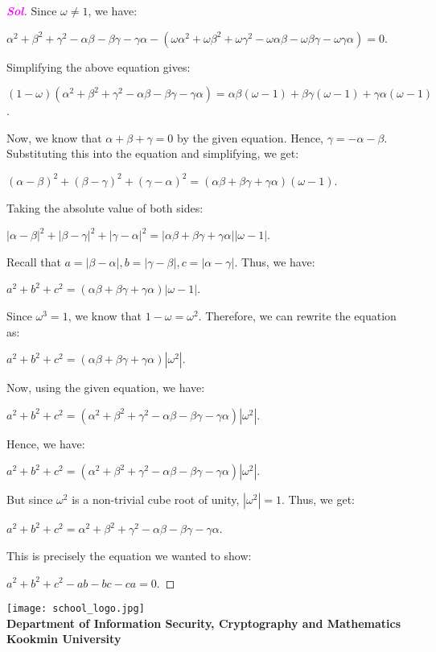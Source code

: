 \documentclass{article}
\newcommand{\footer}[1]{
\begin{flushright}
	\vspace{2em}
	\texttt{[image: school\_logo.jpg]} \\
	\vspace{1em}
	\textcolor{blue2}{\small\textbf{#1}}
\end{flushright}
}
\theoremstyle{definition}
\newcommand{\sol}{\textcolor{magenta}{\bf Sol}}
\begin{document}
\begin{enumerate}
\begin{proof}[\sol]
	Since $\omega \neq 1$, we have:
	
	$\alpha^2 + \beta^2 + \gamma^2 - \alpha\beta - \beta\gamma - \gamma\alpha - (\omega\alpha^2 + \omega\beta^2 + \omega\gamma^2 - \omega\alpha\beta - \omega\beta\gamma - \omega\gamma\alpha) = 0$.
	
	Simplifying the above equation gives:
	
	$(1-\omega)(\alpha^2 + \beta^2 + \gamma^2 - \alpha\beta - \beta\gamma - \gamma\alpha) = \alpha\beta(\omega - 1) + \beta\gamma(\omega - 1) + \gamma\alpha(\omega - 1)$.
	
	Now, we know that $\alpha + \beta + \gamma = 0$ by the given equation. Hence, $\gamma = -\alpha - \beta$. Substituting this into the equation and simplifying, we get:
	
	$(\alpha - \beta)^2 + (\beta - \gamma)^2 + (\gamma - \alpha)^2 = (\alpha\beta + \beta\gamma + \gamma\alpha)(\omega - 1)$.
	
	Taking the absolute value of both sides:
	
	$|\alpha - \beta|^2 + |\beta - \gamma|^2 + |\gamma - \alpha|^2 = |\alpha\beta + \beta\gamma + \gamma\alpha||\omega - 1|$.
	
	Recall that $a = |\beta - \alpha|, b = |\gamma - \beta|, c = |\alpha - \gamma|$. Thus, we have:
	
	$a^2 + b^2 + c^2 = (\alpha\beta + \beta\gamma + \gamma\alpha)|\omega - 1|$.
	
	Since $\omega^3 = 1$, we know that $1 - \omega = \omega^2$. Therefore, we can rewrite the equation as:
	
	$a^2 + b^2 + c^2 = (\alpha\beta + \beta\gamma + \gamma\alpha)|\omega^2|$.
	
	Now, using the given equation, we have:
	
	$a^2 + b^2 + c^2 = (\alpha^2 + \beta^2 + \gamma^2 - \alpha\beta - \beta\gamma - \gamma\alpha)|\omega^2|$.
	
	Hence, we have:
	
	$a^2 + b^2 + c^2 = (\alpha^2 + \beta^2 + \gamma^2 - \alpha\beta - \beta\gamma - \gamma\alpha)|\omega^2|$.
	
	But since $\omega^2$ is a non-trivial cube root of unity, $|\omega^2| = 1$. Thus, we get:
	
	$a^2 + b^2 + c^2 = \alpha^2 + \beta^2 + \gamma^2 - \alpha\beta - \beta\gamma - \gamma\alpha$.
	
	This is precisely the equation we wanted to show:
	
	$a^2 + b^2 + c^2 - ab - bc - ca = 0$.
	
	
	\end{proof}
\end{enumerate}


\footer{Department of Information Security, Cryptography and Mathematics\\ Kookmin University}
\end{document}
